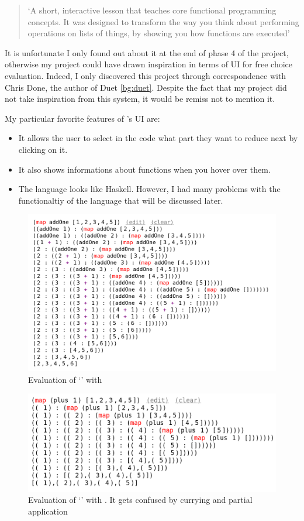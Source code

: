 \begin{quotation}
`A short, interactive lesson that teaches core functional programming concepts. It was designed to transform the way you think about performing operations on lists of things, by showing you how functions are executed' \cite{lambdalessons}
\end{quotation}

\noindent It is unfortunate I only found out about it at the end of phase 4 of the project, otherwise my project could have drawn inspiration in terms of UI for free choice evaluation. Indeed, I only discovered this project through correspondence with Chris Done, the author of Duet \ref{bg:duet}. Despite the fact that my project did not take inspiration from this system, it would be remiss not to mention it. 

My particular favorite features of \llessons's UI are:

\begin{itemize}
    \item It allows the user to select in the code what part they want to reduce next by clicking on it. 
    \item It also shows informations about functions when you hover over them. 
    \item The language looks like Haskell. However, I had many problems with the functionaltiy of the language that will be discussed later. 
\end{itemize}


\begin{figure}[h]
    \centering
    \includegraphics[width=0.75\linewidth]{images/LLessonsMap.png}
    \caption{Evaluation of `' with \llessons}
    \label{bg:llessons_ui}
\end{figure}

\begin{figure}[h]
    \centering
    \includegraphics[width=0.75\linewidth]{images/LLessonsGoingWrong.png}
    \caption{Evaluation of `' with \llessons. It gets confused by currying and partial application}
    \label{bg:llessons_gets_confused}
\end{figure}

